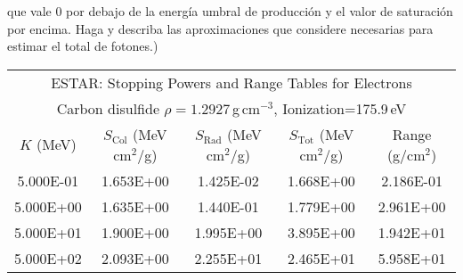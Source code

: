 \documentclass[11pt]{article}
\begin{document}
\begin{enumerate}
\begin{enumerate}
				que vale 0 por debajo de la energía umbral de producción y el
				valor de saturación por encima. Haga y describa las
				aproximaciones que considere necesarias para estimar el total
				de fotones.)
		\end{enumerate}
		\begin{center}
			\begin{tabular}{|c|c|c|c|c|}
				\hline
				\multicolumn{5}{c}{ESTAR: Stopping Powers and Range Tables for
				Electrons} \\
				\multicolumn{5}{c}{Carbon disulfide
				$\rho=1.2927$\,g\,cm$^{-3}$, Ionization=175.9\,eV} \\
				\hline
				$K$ (MeV) & $S_{\mathrm{Col}}$ (MeV cm$^2$/g) &
				$S_{\mathrm{Rad}}$ (MeV cm$^2$/g) & $S_{\mathrm{Tot}}$ (MeV
				cm$^2$/g) & Range (g/cm$^2$)\\
				\hline
				5.000E-01 & 1.653E+00 & 1.425E-02 & 1.668E+00 & 2.186E-01 \\ 
				5.000E+00 & 1.635E+00 & 1.440E-01 & 1.779E+00 & 2.961E+00 \\ 
				5.000E+01 & 1.900E+00 & 1.995E+00 & 3.895E+00 & 1.942E+01 \\ 
				5.000E+02 & 2.093E+00 & 2.255E+01 & 2.465E+01 & 5.958E+01 \\
				\hline
			\end{tabular}
		\end{center}
\end{enumerate}
\end{document}
